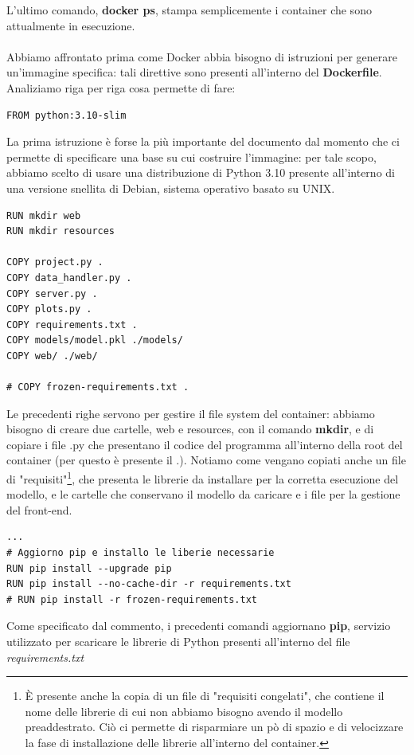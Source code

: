 \documentclass{article}
\begin{document}
L'ultimo comando, \textbf{docker ps}, stampa semplicemente i container che sono attualmente in esecuzione.\\ \\
Abbiamo affrontato prima come Docker abbia bisogno di istruzioni per generare un'immagine specifica: tali direttive sono presenti all'interno del \textbf{Dockerfile}. Analiziamo riga per riga cosa permette di fare:
\begin{verbatim}
FROM python:3.10-slim
\end{verbatim}
La prima istruzione è forse la più importante del documento dal momento che ci permette di specificare una base su cui costruire l'immagine: per tale scopo, abbiamo scelto di usare una distribuzione di Python 3.10 presente all'interno di una versione snellita di Debian, sistema operativo basato su UNIX.
\begin{verbatim}
RUN mkdir web
RUN mkdir resources

COPY project.py .
COPY data_handler.py .
COPY server.py .
COPY plots.py .
COPY requirements.txt .
COPY models/model.pkl ./models/
COPY web/ ./web/

# COPY frozen-requirements.txt .
\end{verbatim}
Le precedenti righe servono per gestire il file system del container: abbiamo bisogno di creare due cartelle, web e resources, con il comando \textbf{mkdir}, e di copiare i file .py che presentano il codice del programma all'interno della root del container (per questo è presente il .). Notiamo come vengano copiati anche un file di "requisiti"\footnote{È presente anche la copia di un file di "requisiti congelati", che contiene il nome delle librerie di cui non abbiamo bisogno avendo il modello preaddestrato. Ciò ci permette di risparmiare un pò di spazio e di velocizzare la fase di installazione delle librerie all'interno del container.}, che presenta le librerie da installare per la corretta esecuzione del modello, e le cartelle che conservano il modello da caricare e i file per la gestione del front-end.
\begin{verbatim}
...
# Aggiorno pip e installo le liberie necessarie
RUN pip install --upgrade pip
RUN pip install --no-cache-dir -r requirements.txt
# RUN pip install -r frozen-requirements.txt
\end{verbatim}
Come specificato dal commento, i precedenti comandi aggiornano \textbf{pip}, servizio utilizzato per scaricare le librerie di Python presenti all'interno del file \textit{requirements.txt}
\end{document}

